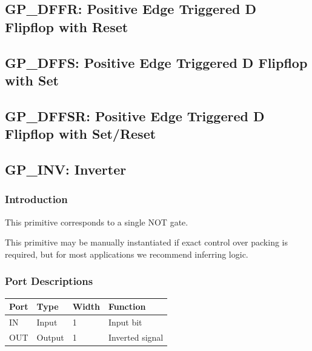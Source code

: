 \documentclass{article}
\begin{document}

\pagebreak
\subsection{GP\_DFFR: Positive Edge Triggered D Flipflop with Reset}


\pagebreak
\subsection{GP\_DFFS: Positive Edge Triggered D Flipflop with Set}


\pagebreak
\subsection{GP\_DFFSR: Positive Edge Triggered D Flipflop with Set/Reset}


\pagebreak
\subsection{GP\_INV: Inverter}

\subsubsection{Introduction}
This primitive corresponds to a single NOT gate.

This primitive may be manually instantiated if exact control over packing is required, but for most applications we 
recommend inferring logic.

\subsubsection{Port Descriptions}

\begin{tabularx}{4in}{|l|l|l|X|}
\hline
{\bfseries Port} & {\bfseries Type} & {\bfseries Width} & {\bfseries Function} \\
\hline
IN & Input & 1 & Input bit \\
\hline
OUT & Output & 1 & Inverted signal \\
\hline
\end{tabularx}
\end{document}
